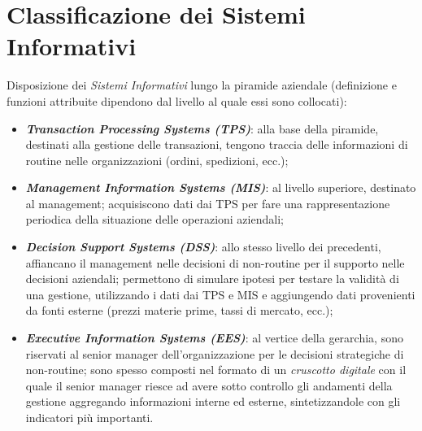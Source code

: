 \documentclass[a4paper, notitlepage, 9pt]{extreport}
\begin{document}
\chapter*{Classificazione dei Sistemi Informativi}
Disposizione dei \textit{Sistemi Informativi} lungo la piramide aziendale (definizione e funzioni attribuite dipendono dal livello al quale essi sono collocati):
\begin{itemize}
	\item \textit{\textbf{Transaction Processing Systems (TPS)}}: alla base della piramide, destinati alla gestione delle transazioni, tengono traccia delle informazioni di routine nelle organizzazioni (ordini, spedizioni, ecc.);
	\item \textit{\textbf{Management Information Systems (MIS)}}: al livello superiore, destinato al management; acquisiscono dati dai TPS per fare una rappresentazione periodica della situazione delle operazioni aziendali;
	\item \textit{\textbf{Decision Support Systems (DSS)}}: allo stesso livello dei precedenti, affiancano il management nelle decisioni di non-routine per il supporto nelle decisioni aziendali; permettono di simulare ipotesi per testare la validità di una gestione, utilizzando i dati dai TPS e MIS e aggiungendo dati provenienti da fonti esterne (prezzi materie prime, tassi di mercato, ecc.);
	\item \textit{\textbf{Executive Information Systems (EES)}}: al vertice della gerarchia, sono riservati al senior manager dell'organizzazione per le decisioni strategiche di non-routine; sono spesso composti nel formato di un \textit{cruscotto digitale} con il quale il senior manager riesce ad avere sotto controllo gli andamenti della gestione aggregando informazioni interne ed esterne, sintetizzandole con gli indicatori più importanti.
\end{itemize}
\end{document}
